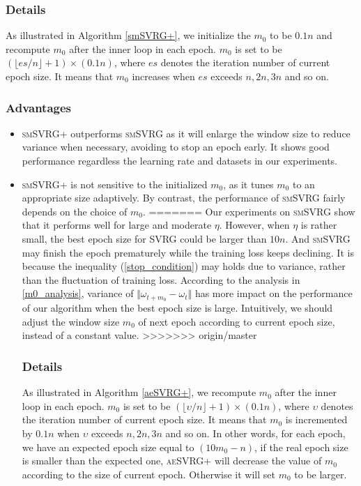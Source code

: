 \documentclass[conference]{IEEEtran}
\begin{document}
\begin{algorithm}[t]
 \subsubsection{Details}
 As illustrated in Algorithm \ref{smSVRG+}, we initialize the $m_0$ to be $0.1n$ and recompute $m_0$ after the inner loop in each epoch. $m_0$ is set to be $(\lfloor es/n \rfloor+1) \times (0.1n)$, where $es$ denotes the iteration number of current epoch size. It means that $m_0$ increases when $es$ exceeds $n,2n,3n$ and so on.
 \subsubsection{Advantages}
 \begin{itemize}
 \item \textsc{smSVRG+} outperforms \textsc{smSVRG} as it will enlarge the window size to reduce variance when necessary, avoiding to stop an epoch early. It shows good performance regardless the learning rate and datasets in  our experiments. 
 \item \textsc{smSVRG+} is not sensitive to the initialized $m_0$, as it tunes $m_0$ to an appropriate size adaptively. By contrast, the performance of \textsc{smSVRG} fairly depends on the choice of $m_0$.
=======
 Our experiments on \textsc{smSVRG} show that it performs well for large and moderate $\eta$. However, when $\eta$ is rather small, the best epoch size for SVRG could be larger than $10n$. And \textsc{smSVRG} may finish the epoch prematurely while the training loss keeps declining. It is because the inequality (\ref{stop_condition}) may holds due to variance, rather than the fluctuation of training loss. According to the analysis in \ref{m0_analysis}, variance of $\Vert\omega_{t+m_0}-\omega_t\Vert$ has more impact on the performance of our algorithm when the best epoch size is large. Intuitively, we should adjust the window size $m_0$ of next epoch according to current epoch size, instead of a constant value.
>>>>>>> origin/master
 \subsubsection{Details}
 As illustrated in Algorithm \ref{aeSVRG+}, we recompute $m_0$ after the inner loop in each epoch. $m_0$ is set to be $(\lfloor \upsilon/n \rfloor+1) \times (0.1n)$, where $\upsilon$ denotes the iteration number of current epoch size. It means that $m_0$ is incremented by $0.1n$ when $\upsilon$ exceeds $n,2n,3n$ and so on. In other words, for each epoch, we have an expected epoch size equal to $(10m_0-n)$, if the real epoch size is smaller than the expected one, \textsc{aeSVRG+} will decrease the value of $m_0$ according to the size of current epoch. Otherwise it will set $m_0$ to be larger.
 

\end{itemize}
\end{algorithm}
\end{document}
